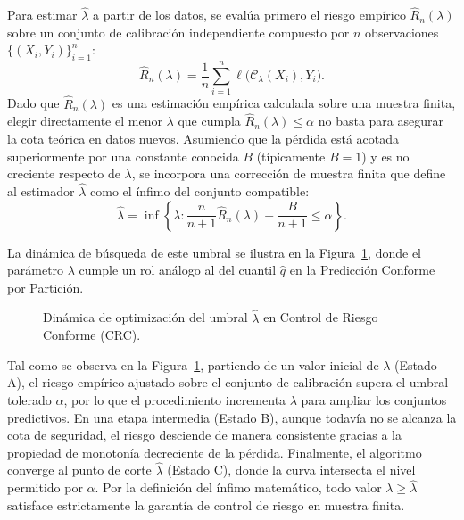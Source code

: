 Para estimar $\hat{\lambda}$ a partir de los datos, se evalúa primero el riesgo empírico $\hat{R}_n(\lambda)$ sobre un conjunto de calibración independiente compuesto por $n$ observaciones $\{(X_i, Y_i)\}_{i=1}^n$:
\begin{equation}
    \hat{R}_n(\lambda) = \frac{1}{n} \sum_{i=1}^n \ell\big(\mathcal{C}_\lambda(X_i), Y_i\big).
\end{equation}
Dado que $\hat{R}_n(\lambda)$ es una estimación empírica calculada sobre una muestra finita, elegir directamente el menor $\lambda$ que cumpla $\hat{R}_n(\lambda) \leq \alpha$ no basta para asegurar la cota teórica en datos nuevos. Asumiendo que la pérdida está acotada superiormente por una constante conocida $B$ (típicamente $B=1$) y es no creciente respecto de $\lambda$, se incorpora una corrección de muestra finita que define al estimador $\hat{\lambda}$ como el ínfimo del conjunto compatible:
\begin{equation}
    \hat{\lambda} = \inf \left\{ \lambda : \frac{n}{n+1} \hat{R}_n(\lambda) + \frac{B}{n+1} \leq \alpha \right\}.
\end{equation}

La dinámica de búsqueda de este umbral se ilustra en la Figura~\ref{fig:crc_optimization_flow}, donde el parámetro $\lambda$ cumple un rol análogo al del cuantil $\hat{q}$ en la Predicción Conforme por Partición.

\begin{figure}[H]
    \centering
    \resizebox{1.0\textwidth}{!}{}
    \caption{Dinámica de optimización del umbral $\hat{\lambda}$ en Control de Riesgo Conforme (CRC).}
    \label{fig:crc_optimization_flow}
\end{figure}

Tal como se observa en la Figura~\ref{fig:crc_optimization_flow}, partiendo de un valor inicial de $\lambda$ (Estado A), el riesgo empírico ajustado sobre el conjunto de calibración supera el umbral tolerado $\alpha$, por lo que el procedimiento incrementa $\lambda$ para ampliar los conjuntos predictivos. En una etapa intermedia (Estado B), aunque todavía no se alcanza la cota de seguridad, el riesgo desciende de manera consistente gracias a la propiedad de monotonía decreciente de la pérdida. Finalmente, el algoritmo converge al punto de corte $\hat{\lambda}$ (Estado C), donde la curva intersecta el nivel permitido por $\alpha$. Por la definición del ínfimo matemático, todo valor $\lambda \geq \hat{\lambda}$ satisface estrictamente la garantía de control de riesgo en muestra finita.

